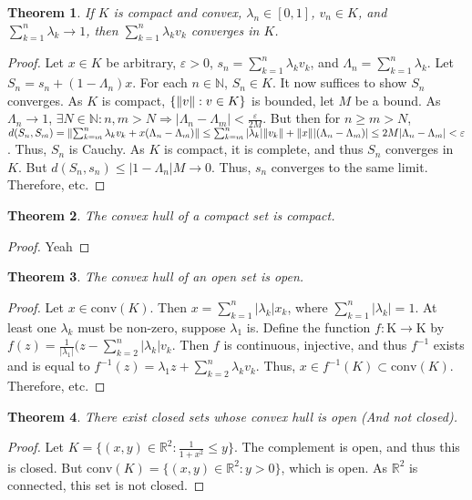 \documentclass[crop=false,class=book]{standalone}
\theoremstyle{mystyle}
\newtheorem{theorem}{Theorem}[section]
\DeclarePairedDelimiter\norm{\lVert}{\rVert}
\begin{document}
\begin{theorem}
If $K$ is compact and convex, $\lambda_n\in[0,1]$, $v_n\in K$, and $\sum_{k=1}^{n}\lambda_k \rightarrow 1$, then $\sum_{k=1}^{n}\lambda_k v_k$ converges in $K$.
\end{theorem}
\begin{proof}
Let $x\in K$ be arbitrary, $\varepsilon>0$, $s_n = \sum_{k=1}^{n}\lambda_k v_k$, and $\Lambda_n = \sum_{k=1}^{n}\lambda_k$. Let $S_n = s_n + (1-\Lambda_n)x$. For each $n\in \mathbb{N}$, $S_n\in K$. It now suffices to show $S_n$ converges. As $K$ is compact, $\{\norm{v}:v\in K\}$ is bounded, let $M$ be a bound. As $\Lambda_n\rightarrow 1$, $\exists N\in \mathbb{N}:n,m>N\Rightarrow |\Lambda_n-\Lambda_m|<\frac{\varepsilon}{2M}$. But then for $n\geq m >N$, $d(S_n,S_m) = \norm{\sum_{k=m}^{n}\lambda_k v_k+x(\Lambda_n-\Lambda_m)} \leq \sum_{k=m}^{n}|\lambda_k| \norm{v_k}+\norm{x}|(\Lambda_n-\Lambda_m)|\leq 2M|\Lambda_{n}-\Lambda_{m}|<\varepsilon$. Thus, $S_n$ is Cauchy. As $K$ is compact, it is complete, and thus $S_n$ converges in $K$. But $d(S_n,s_n)\leq |1-\Lambda_n|M\rightarrow 0$. Thus, $s_n$ converges to the same limit. Therefore, etc.
\end{proof}
\begin{theorem}
The convex hull of a compact set is compact.
\end{theorem}
\begin{proof}
Yeah
\end{proof}
\begin{theorem}
The convex hull of an open set is open.
\end{theorem}
\begin{proof}
Let $x\in \textrm{conv}(K)$. Then $x=\sum_{k=1}^{n}|\lambda_k| x_k$, where $\sum_{k=1}^{n}|\lambda_k| = 1$. At least one $\lambda_k$ must be non-zero, suppose $\lambda_1$ is. Define the function $f:\textrm{K}\rightarrow \textrm{K}$ by $f(z) = \frac{1}{|\lambda_1|}(z-\sum_{k=2}^{n}|\lambda_k|v_k$. Then $f$ is continuous, injective, and thus $f^{-1}$ exists and is equal to $f^{-1}(z) = \lambda_1 z +\sum_{k=2}^{n}\lambda_k v_k$. Thus, $x\in f^{-1}(K)\subset\textrm{conv}(K)$. Therefore, etc. 
\end{proof}
\begin{theorem}
There exist closed sets whose convex hull is open (And not closed).
\end{theorem}
\begin{proof}
Let $K = \{(x,y)\in \mathbb{R}^2:\frac{1}{1+x^2}\leq y\}$. The complement is open, and thus this is closed. But $\textrm{conv}(K) = \{(x,y)\in \mathbb{R}^2:y>0\}$, which is open. As $\mathbb{R}^2$ is connected, this set is not closed.
\end{proof}
\end{document}

